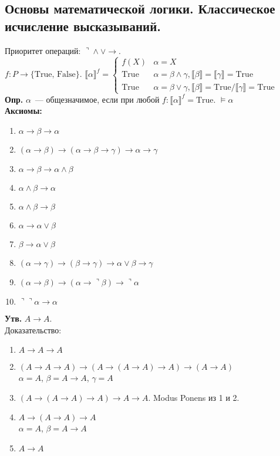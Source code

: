\documentclass{article}
\begin{document}
	\subsection{Основы математической логики. Классическое исчисление высказываний.}
	Приоритет операций: $\urcorner \wedge \vee \rightarrow$. \\
	$f: P \rightarrow \{ \text{True, False} \}$. $\llbracket \alpha \rrbracket^f =
	\begin{cases}
		f(X) & \alpha = X \\
		\text{True} & \alpha = \beta \wedge \gamma, \llbracket \beta \rrbracket = \llbracket \gamma \rrbracket = \text{True} \\
		\text{True} & \alpha = \beta \vee \gamma, \llbracket \beta \rrbracket = \text{True} / \llbracket \gamma \rrbracket = \text{True}
	\end{cases}$ \\
	\textbf{Опр.} $\alpha$~--- общезначимое, если при любой $f: \llbracket \alpha \rrbracket^f = \text{True}$. $\vDash \alpha$ \\
	\textbf{Аксиомы:}
	\begin{enumerate}
		\item $\alpha \rightarrow \beta \rightarrow \alpha$
		\item $(\alpha \rightarrow \beta) \rightarrow (\alpha \rightarrow \beta \rightarrow \gamma) \rightarrow \alpha \rightarrow \gamma$
		\item $\alpha \rightarrow \beta \rightarrow \alpha \wedge \beta$
		\item $\alpha \wedge \beta \rightarrow \alpha$
		\item $\alpha \wedge \beta \rightarrow \beta$
		\item $\alpha \rightarrow \alpha \vee \beta$
		\item $\beta \rightarrow \alpha \vee \beta$
		\item $(\alpha \rightarrow \gamma) \rightarrow (\beta \rightarrow \gamma) \rightarrow \alpha \vee \beta \rightarrow \gamma$
		\item $(\alpha \rightarrow \beta) \rightarrow (\alpha \rightarrow \urcorner \beta) \rightarrow \urcorner \alpha$
		\item $\urcorner \urcorner \alpha \rightarrow \alpha$
	\end{enumerate}
	\textbf{Утв.} $A \rightarrow A$. \\
	Доказательство:
	\begin{enumerate}
		\item $A \rightarrow A \rightarrow A$
		\item $(A \rightarrow A \rightarrow A) \rightarrow (A \rightarrow (A \rightarrow A) \rightarrow A) \rightarrow (A \rightarrow A)$ \\
		$\alpha = A$, $\beta = A \rightarrow A$, $\gamma = A$
		\item $(A \rightarrow (A \rightarrow A) \rightarrow A) \rightarrow A \rightarrow A$. Modus Ponens из 1 и 2.
		\item $A \rightarrow (A \rightarrow A) \rightarrow A $ \\
		$\alpha = A$, $\beta = A \rightarrow A$
		\item $A \rightarrow A$
	\end{enumerate}
\end{document}
